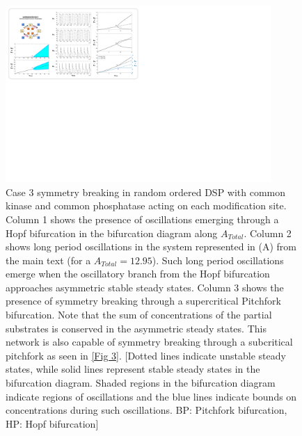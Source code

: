 \documentclass[9pt,lineno]{elife}
\begin{document}
\clearpage
\begin{figure}[ht!]
    \centering
    \includegraphics[width = 0.9\textwidth, keepaspectratio]{FigS02.pdf}
    \caption{Case 3 symmetry breaking in random ordered DSP with common kinase and common phosphatase acting on each modification site.
    Column 1 shows the presence of oscillations emerging through a Hopf bifurcation in the bifurcation diagram along $A_{Total}$. 
    Column 2 shows long period oscillations in the system represented in (A) from the main text (for a $A_{Total} = 12.95$). Such long period oscillations emerge when the oscillatory branch from the Hopf bifurcation approaches asymmetric stable steady states.  
    Column 3 shows the presence of symmetry breaking through a supercritical Pitchfork bifurcation. Note that the sum of concentrations of the partial substrates is conserved in the asymmetric steady states. This network is also capable of symmetry breaking through a subcritical pitchfork as seen in \cref{Fig 3}.
    [Dotted lines indicate unstable steady states, while solid lines represent stable steady states in the bifurcation diagram. Shaded regions in the bifurcation diagram indicate regions of oscillations and the blue lines indicate bounds on concentrations during such oscillations. BP: Pitchfork bifurcation, HP: Hopf bifurcation]}
    \label{Fig S2}
\end{figure}
\end{document}
